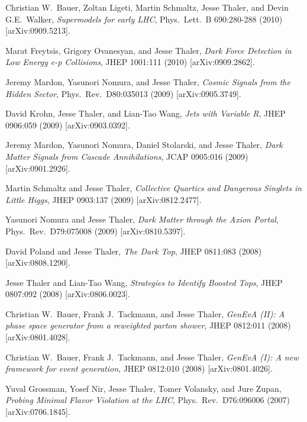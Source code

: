 \begin{list}{[]\addtocounter{jessecount}{-1}}{\leftmargin=3em \itemsep=4pt}
\item
 Christian W.\ Bauer, Zoltan Ligeti, Martin Schmaltz, Jesse Thaler, and Devin G.E.\ Walker,
\emph{Supermodels for early LHC},
Phys.\ Lett.\ B 690:280-288 (2010)
[arXiv:0909.5213].

\item
 Marat Freytsis, Grigory Ovanesyan, and Jesse Thaler,
\emph{Dark Force Detection in Low Energy e-p Collisions},
JHEP 1001:111 (2010)
[arXiv:0909.2862].

\item
 Jeremy Mardon, Yasunori Nomura, and Jesse Thaler,
\emph{Cosmic Signals from the Hidden Sector},
Phys.\ Rev.\ D80:035013 (2009)
[arXiv:0905.3749].

\item
 David Krohn, Jesse Thaler, and Lian-Tao Wang,
\emph{Jets with Variable R},
JHEP 0906:059 (2009)
[arXiv:0903.0392].

\item
 Jeremy Mardon, Yasunori Nomura, Daniel Stolarski, and Jesse Thaler,
\emph{Dark Matter Signals from Cascade Annihilations},
JCAP 0905:016 (2009)
[arXiv:0901.2926].

\item
 Martin Schmaltz and Jesse Thaler,
\emph{Collective Quartics and Dangerous Singlets in Little Higgs},
JHEP 0903:137 (2009)
[arXiv:0812.2477].

\item
 Yasunori Nomura and Jesse Thaler,
\emph{Dark Matter through the Axion Portal},
Phys.\ Rev.\ D79:075008 (2009)
[arXiv:0810.5397].

\item
 David Poland and Jesse Thaler,
\emph{The Dark Top},
JHEP 0811:083 (2008)
[arXiv:0808.1290].

\item
 Jesse Thaler and Lian-Tao Wang,
\emph{Strategies to Identify Boosted Tops},
JHEP 0807:092 (2008)
[arXiv:0806.0023].

\item
 Christian W.\ Bauer, Frank J.\ Tackmann, and Jesse Thaler,
\emph{GenEvA (II): A phase space generator from a reweighted parton shower},
JHEP 0812:011 (2008)
[arXiv:0801.4028].

\item
 Christian W.\ Bauer, Frank J.\ Tackmann, and Jesse Thaler,
\emph{GenEvA (I): A new framework for event generation},
JHEP 0812:010 (2008)
[arXiv:0801.4026].

\item
 Yuval Grossman, Yosef Nir, Jesse Thaler, Tomer Volansky, and Jure Zupan,
\emph{Probing Minimal Flavor Violation at the LHC},
Phys.\ Rev.\ D76:096006 (2007)
[arXiv:0706.1845].


\end{list}

